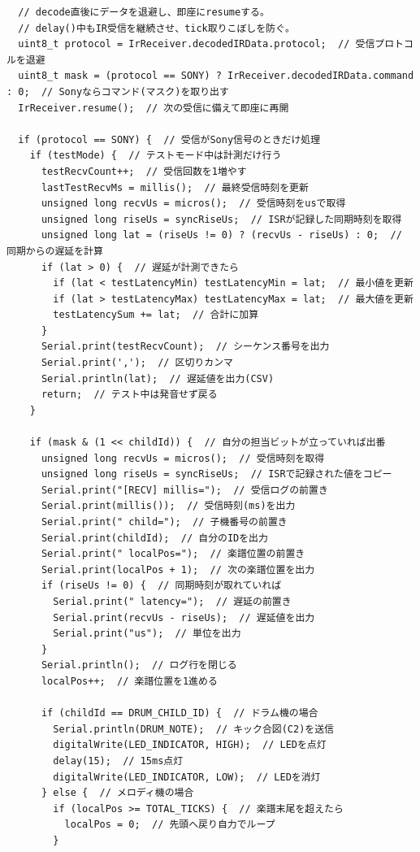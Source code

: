 \documentclass[uplatex,dvipdfmx]{jlreq}
\begin{document}
\begin{lstlisting}
  // decode直後にデータを退避し、即座にresumeする。
  // delay()中もIR受信を継続させ、tick取りこぼしを防ぐ。
  uint8_t protocol = IrReceiver.decodedIRData.protocol;  // 受信プロトコルを退避
  uint8_t mask = (protocol == SONY) ? IrReceiver.decodedIRData.command : 0;  // Sonyならコマンド(マスク)を取り出す
  IrReceiver.resume();  // 次の受信に備えて即座に再開

  if (protocol == SONY) {  // 受信がSony信号のときだけ処理
    if (testMode) {  // テストモード中は計測だけ行う
      testRecvCount++;  // 受信回数を1増やす
      lastTestRecvMs = millis();  // 最終受信時刻を更新
      unsigned long recvUs = micros();  // 受信時刻をusで取得
      unsigned long riseUs = syncRiseUs;  // ISRが記録した同期時刻を取得
      unsigned long lat = (riseUs != 0) ? (recvUs - riseUs) : 0;  // 同期からの遅延を計算
      if (lat > 0) {  // 遅延が計測できたら
        if (lat < testLatencyMin) testLatencyMin = lat;  // 最小値を更新
        if (lat > testLatencyMax) testLatencyMax = lat;  // 最大値を更新
        testLatencySum += lat;  // 合計に加算
      }
      Serial.print(testRecvCount);  // シーケンス番号を出力
      Serial.print(',');  // 区切りカンマ
      Serial.println(lat);  // 遅延値を出力(CSV)
      return;  // テスト中は発音せず戻る
    }

    if (mask & (1 << childId)) {  // 自分の担当ビットが立っていれば出番
      unsigned long recvUs = micros();  // 受信時刻を取得
      unsigned long riseUs = syncRiseUs;  // ISRで記録された値をコピー
      Serial.print("[RECV] millis=");  // 受信ログの前置き
      Serial.print(millis());  // 受信時刻(ms)を出力
      Serial.print(" child=");  // 子機番号の前置き
      Serial.print(childId);  // 自分のIDを出力
      Serial.print(" localPos=");  // 楽譜位置の前置き
      Serial.print(localPos + 1);  // 次の楽譜位置を出力
      if (riseUs != 0) {  // 同期時刻が取れていれば
        Serial.print(" latency=");  // 遅延の前置き
        Serial.print(recvUs - riseUs);  // 遅延値を出力
        Serial.print("us");  // 単位を出力
      }
      Serial.println();  // ログ行を閉じる
      localPos++;  // 楽譜位置を1進める

      if (childId == DRUM_CHILD_ID) {  // ドラム機の場合
        Serial.println(DRUM_NOTE);  // キック合図(C2)を送信
        digitalWrite(LED_INDICATOR, HIGH);  // LEDを点灯
        delay(15);  // 15ms点灯
        digitalWrite(LED_INDICATOR, LOW);  // LEDを消灯
      } else {  // メロディ機の場合
        if (localPos >= TOTAL_TICKS) {  // 楽譜末尾を超えたら
          localPos = 0;  // 先頭へ戻り自力でループ
        }


\end{lstlisting}
\end{document}
